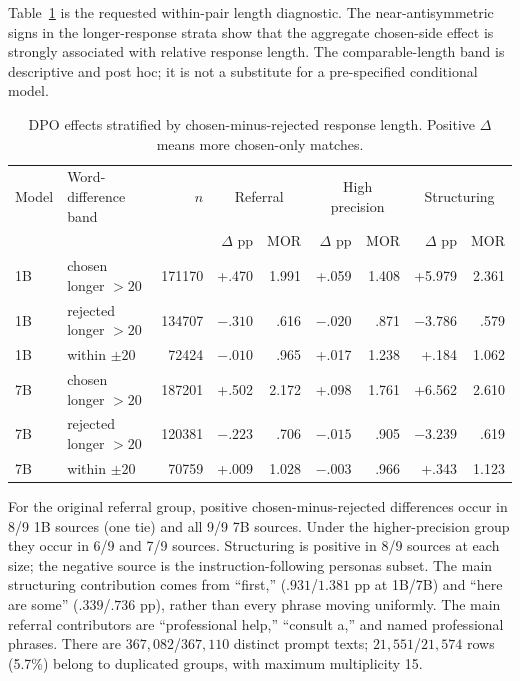 \documentclass[11pt]{article}
\begin{document}
Table~\ref{tab:dpo-length} is the requested within-pair length diagnostic. The
near-antisymmetric signs in the longer-response strata show that the aggregate
chosen-side effect is strongly associated with relative response length. The
comparable-length band is descriptive and post hoc; it is not a substitute for
a pre-specified conditional model.

\begin{table}[h]
\centering
\footnotesize
\setlength{\tabcolsep}{3pt}
\begin{tabular}{llrrrrrrr}
\toprule
Model & Word-difference band & $n$ & \multicolumn{2}{c}{Referral} &
\multicolumn{2}{c}{High precision} & \multicolumn{2}{c}{Structuring} \\
 & & & $\Delta$ pp & MOR & $\Delta$ pp & MOR & $\Delta$ pp & MOR \\
\midrule
1B & chosen longer $>20$ & 171170 & +.470 & 1.991 & +.059 & 1.408 & +5.979 & 2.361 \\
1B & rejected longer $>20$ & 134707 & $-.310$ & .616 & $-.020$ & .871 & $-3.786$ & .579 \\
1B & within $\pm20$ & 72424 & $-.010$ & .965 & +.017 & 1.238 & +.184 & 1.062 \\
\midrule
7B & chosen longer $>20$ & 187201 & +.502 & 2.172 & +.098 & 1.761 & +6.562 & 2.610 \\
7B & rejected longer $>20$ & 120381 & $-.223$ & .706 & $-.015$ & .905 & $-3.239$ & .619 \\
7B & within $\pm20$ & 70759 & +.009 & 1.028 & $-.003$ & .966 & +.343 & 1.123 \\
\bottomrule
\end{tabular}
\caption{DPO effects stratified by chosen-minus-rejected response length.
Positive $\Delta$ means more chosen-only matches.}
\label{tab:dpo-length}
\end{table}

For the original referral group, positive chosen-minus-rejected differences
occur in 8/9 1B sources (one tie) and all 9/9 7B sources. Under the
higher-precision group they occur in 6/9 and 7/9 sources. Structuring is positive
in 8/9 sources at each size; the negative source is the instruction-following
personas subset. The main structuring contribution comes from ``first,''
($.931$/$1.381$ pp at 1B/7B) and ``here are some''
($.339$/$.736$ pp), rather than every phrase moving uniformly. The main
referral contributors are ``professional help,'' ``consult a,'' and named
professional phrases. There are $367{,}082$/$367{,}110$ distinct prompt texts;
$21{,}551$/$21{,}574$ rows (5.7\%) belong to duplicated groups, with maximum
multiplicity 15.
\end{document}
